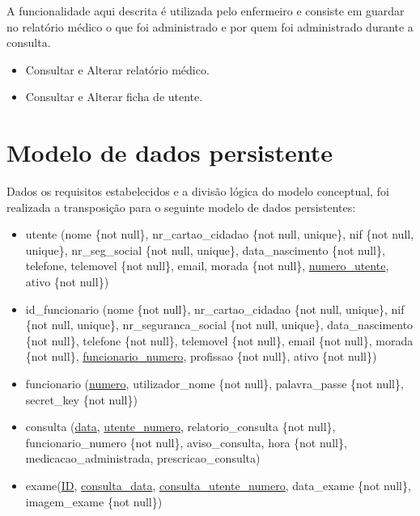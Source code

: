 \documentclass[11pt,a4paper,twoside]{report}
\begin{document}
A funcionalidade aqui descrita é utilizada pelo enfermeiro e consiste em guardar no relatório médico o que foi administrado e por quem foi administrado durante a consulta. 


%
%

\begin{itemize}
	\item     Consultar e Alterar relatório médico.
	\item     Consultar e Alterar ficha de utente.
\end{itemize}

\chapter{Modelo de dados persistente}

Dados os requisitos estabelecidos e a divisão lógica do modelo conceptual, foi realizada a transposição para o seguinte modelo de dados persistentes:

\begin{itemize}
	\item   utente (nome \{not null\}, nr\_cartao\_cidadao \{not null, unique\}, nif \{not null, unique\}, nr\_seg\_social \{not null, unique\}, data\_nascimento \{not null\}, telefone, telemovel \{not null\}, email, morada \{not null\}, \underline{numero\_utente}, ativo \{not null\})
	
	\item	id\_funcionario (nome \{not null\}, nr\_cartao\_cidadao \{not null, unique\}, nif \{not null, unique\}, nr\_seguranca\_social \{not null, unique\}, data\_nascimento \{not null\}, telefone \{not null\}, telemovel \{not null\}, email \{not null\}, morada \{not null\}, \underline{funcionario\_numero}, profissao \{not null\}, ativo \{not null\})
	
	\item	funcionario (\underline{numero}, utilizador\_nome \{not null\}, palavra\_passe \{not null\}, secret\_key \{not null\})
	
	\item	consulta (\underline{data}, \underline{utente\_numero}, relatorio\_consulta \{not null\}, funcionario\_numero \{not null\}, aviso\_consulta, hora \{not null\}, medicacao\_administrada, prescricao\_consulta)
	
	\item	exame(\underline{ID}, \underline{consulta\_data}, \underline{consulta\_utente\_numero}, data\_exame \{not null\}, imagem\_exame \{not null\}) \\
\end{itemize} 
	
\end{document}
